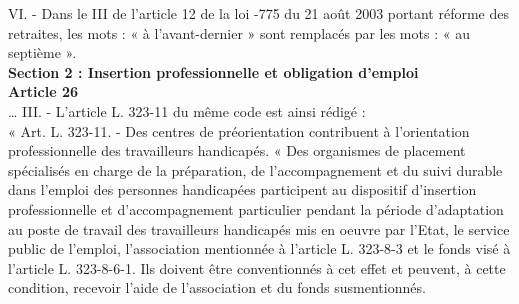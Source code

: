 VI. - Dans le III de l'article 12 de la loi -775 du 21 août 2003 portant réforme des retraites, les mots : « à l'avant-dernier » sont remplacés par les mots : « au septième ».\\


\textbf{Section 2 : Insertion professionnelle et obligation d'emploi}\\


\textbf{Article 26}\\

…
III. - L'article L. 323-11 du même code est ainsi rédigé :\\
« Art. L. 323-11. - Des centres de préorientation contribuent à l'orientation professionnelle des travailleurs handicapés.
« Des organismes de placement spécialisés en charge de la préparation, de l'accompagnement et du suivi durable dans l'emploi des personnes handicapées participent au dispositif d'insertion professionnelle et d'accompagnement particulier pendant la période d'adaptation au poste de travail des travailleurs handicapés mis en oeuvre par l'Etat, le service public de l'emploi, l'association mentionnée à l'article L. 323-8-3 et le fonds visé à l'article L. 323-8-6-1. Ils doivent être conventionnés à cet effet et peuvent, à cette condition, recevoir l'aide de l'association et du fonds susmentionnés.\\

